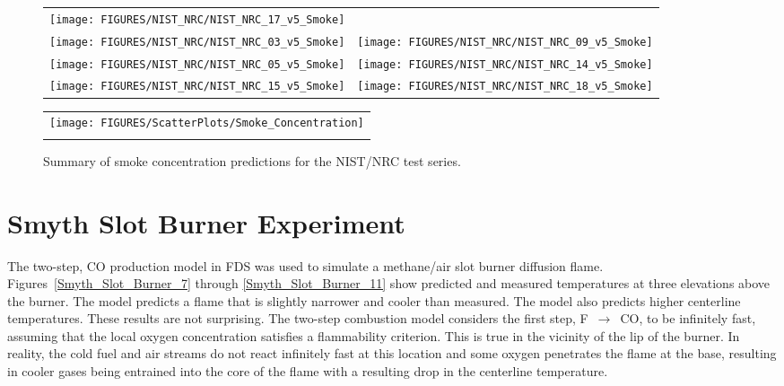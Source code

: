 \begin{figure}[p]
\begin{tabular*}{\textwidth}{l@{\extracolsep{\fill}}r}
\texttt{[image: FIGURES/NIST\_NRC/NIST\_NRC\_17\_v5\_Smoke]} &
 \\
\texttt{[image: FIGURES/NIST\_NRC/NIST\_NRC\_03\_v5\_Smoke]} &
\texttt{[image: FIGURES/NIST\_NRC/NIST\_NRC\_09\_v5\_Smoke]} \\
\texttt{[image: FIGURES/NIST\_NRC/NIST\_NRC\_05\_v5\_Smoke]} &
\texttt{[image: FIGURES/NIST\_NRC/NIST\_NRC\_14\_v5\_Smoke]} \\
\texttt{[image: FIGURES/NIST\_NRC/NIST\_NRC\_15\_v5\_Smoke]} &
\texttt{[image: FIGURES/NIST\_NRC/NIST\_NRC\_18\_v5\_Smoke]}
\end{tabular*}
\end{figure}



\begin{figure}[p]
\begin{center}
\begin{tabular}{c}
\texttt{[image: FIGURES/ScatterPlots/Smoke\_Concentration]} \\
\vspace{0.25in} \\
\end{tabular}
\end{center}
\caption[Summary of smoke concentration predictions, NIST/NRC test series]
{Summary of smoke concentration predictions for the NIST/NRC test series.}
\end{figure}



\clearpage

\section{Smyth Slot Burner Experiment}

The two-step, CO production model in FDS was used to simulate a methane/air slot burner diffusion flame.
Figures~\ref{Smyth_Slot_Burner_7} through \ref{Smyth_Slot_Burner_11}
show predicted and measured temperatures at three elevations above the burner.  The model predicts a flame that is slightly narrower
and cooler than measured.  The model
also predicts higher centerline temperatures.  These results are not surprising.  The two-step combustion model considers
the first step, F~$\longrightarrow$~CO, to be infinitely fast, assuming that the local oxygen concentration satisfies a
flammability criterion.  This is true in the vicinity of the lip of the burner.  In reality, the cold fuel and air
streams do not react infinitely fast at this location and some oxygen penetrates the flame at the base, resulting in cooler
gases being entrained into the core of the flame with a resulting drop in the centerline temperature.

